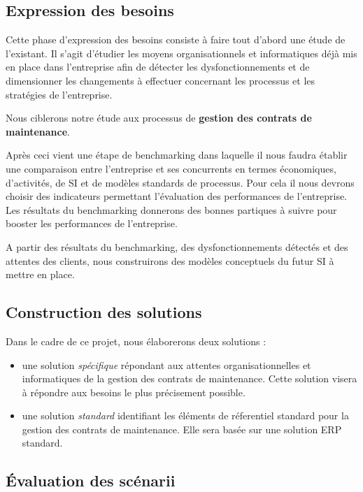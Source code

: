 \subsection{Expression des besoins}

Cette phase d'expression des besoins consiste \`a faire tout d'abord une \'etude de l'existant.
Il s'agit d'\'etudier les moyens organisationnels et informatiques d\'ej\`a mis en place dans l'entreprise afin de détecter les dysfonctionnements et de dimensionner les changements \`a effectuer concernant les processus et les strat\'egies de l'entreprise.

Nous ciblerons notre \'etude aux processus de \textbf{gestion des contrats de maintenance}.

Apr\`es ceci vient une \'etape de benchmarking dans laquelle il nous faudra \'etablir une comparaison entre l'entreprise et ses concurrents en termes \'economiques, d'activit\'es, de SI et de mod\`eles standards de processus.
Pour cela il nous devrons choisir des indicateurs permettant l'\'evaluation des performances de l'entreprise. Les r\'esultats du benchmarking donnerons des bonnes partiques \`a suivre pour booster les performances de l'entreprise.

A partir des r\'esultats du benchmarking, des dysfonctionnements d\'etect\'es et des  attentes des clients, nous construirons des mod\`eles conceptuels du futur SI \`a mettre en place.

\subsection{Construction des solutions}

Dans le cadre de ce projet, nous \'elaborerons deux solutions :

\begin{itemize}
 \item une solution \textit{sp\'ecifique} r\'epondant aux attentes organisationnelles et informatiques de la gestion des contrats de maintenance. Cette solution visera \`a r\'epondre aux besoins le plus pr\'ecisement possible.
 \item une solution \textit{standard} identifiant les \'el\'ements de r\'eferentiel standard pour la gestion des contrats de maintenance. Elle sera bas\'ee sur une solution ERP standard.
\end{itemize}

\subsection{\'Evaluation des sc\'enarii}

